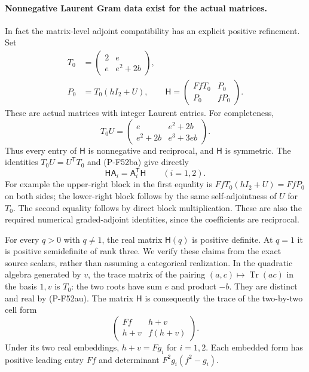 \paragraph{Nonnegative Laurent Gram data exist for the actual matrices.}
In fact the matrix-level adjoint compatibility has an
explicit positive refinement. Set
\[
 \begin{split}
 T_0&=\begin{pmatrix}2&e\\e&e^2+2b\end{pmatrix},\\
 P_0&=T_0(hI_2+U),\qquad
 \mathsf H=\begin{pmatrix}FfT_0&P_0\\P_0&fP_0\end{pmatrix}.
 \end{split}                                                    \tag{P-F52bg}
\]
These are actual matrices with integer Laurent entries.
For completeness,
\[
 T_0U=\begin{pmatrix}
 e&e^2+2b\\ e^2+2b&e^3+3eb
 \end{pmatrix}.
                                                               \tag{P-F52bh}
\]
Thus every entry of $\mathsf H$ is nonnegative and
reciprocal, and $\mathsf H$ is symmetric. The identities
$T_0U=U^{\mathsf T}T_0$ and (P-F52ba) give directly
\[
             \mathsf H\mathsf A_i
                      =\mathsf A_i^{\mathsf T}\mathsf H
                       \qquad(i=1,2).
                                                               \tag{P-F52bi}
\]
For example the upper-right block in the first equality
is $FfT_0(hI_2+U)=FfP_0$ on both sides; the lower-right
block follows by the same self-adjointness of $U$ for
$T_0$. The second equality follows by direct block
multiplication. These are also the required numerical
graded-adjoint identities, since the coefficients are
reciprocal.

For every $q>0$ with $q\ne1$, the real matrix $\mathsf H(q)$
is positive definite. At $q=1$ it is positive semidefinite
of rank three. We verify these claims from the exact
source scalars, rather than assuming a categorical
realization. In the quadratic algebra generated by $v$,
the trace matrix of the pairing $(a,c)\mapsto
\operatorname{Tr}(ac)$ in the basis $1,v$ is $T_0$:
the two roots have sum $e$ and product $-b$.
They are distinct and real by (P-F52au).
The matrix $\mathsf H$ is consequently the trace of the
two-by-two cell form
\[
           \begin{pmatrix}
               Ff&h+v\\h+v&f(h+v)
           \end{pmatrix}.
                                                               \tag{P-F52bj}
\]
Under its two real embeddings, $h+v=Fg_i$ for
$i=1,2$. Each embedded form has positive leading entry
$Ff$ and determinant $F^2g_i(f^2-g_i)$.


